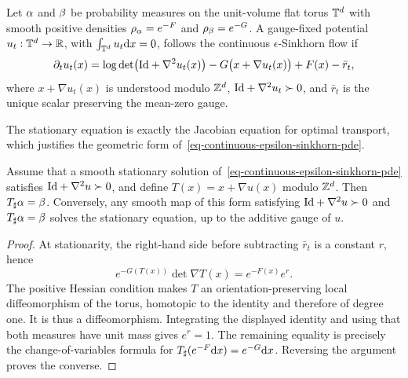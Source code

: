 \begin{defn}\label{def-continuous-epsilon-sinkhorn}
	Let $\alpha$ and $\beta$ be probability measures on the unit-volume flat torus $\mathbb{T}^d$ with smooth positive densities $\rho_{\alpha}=e^{-F}$ and $\rho_{\beta}=e^{-G}$. A gauge-fixed potential $u_t:\mathbb{T}^d\to\mathbb{R}$, with $\int_{\mathbb{T}^d}u_t\mathrm{d} x=0$, follows the continuous $\epsilon$-Sinkhorn flow if
	\begin{equation}\label{eq-continuous-epsilon-sinkhorn-pde}
		\partial_t u_t(x)
		=
		\log\det\bigl(\mathrm{Id}+\nabla^2u_t(x)\bigr)
		-G\bigl(x+\nabla u_t(x)\bigr)
		+F(x)-\bar r_t,
	\end{equation}
	where $x+\nabla u_t(x)$ is understood modulo $\mathbb{Z}^d$, $\mathrm{Id}+\nabla^2u_t\succ0$, and $\bar r_t$ is the unique scalar preserving the mean-zero gauge.
\end{defn}

The stationary equation is exactly the Jacobian equation for optimal transport, which justifies the geometric form of~\eqref{eq-continuous-epsilon-sinkhorn-pde}.

\begin{prop}\label{prop-continuous-sinkhorn-stationary}
	Assume that a smooth stationary solution of~\eqref{eq-continuous-epsilon-sinkhorn-pde} satisfies $\mathrm{Id}+\nabla^2u\succ0$, and define $T(x)=x+\nabla u(x)$ modulo $\mathbb{Z}^d$. Then $T_\sharp\alpha=\beta$. Conversely, any smooth map of this form satisfying $\mathrm{Id}+\nabla^2u\succ0$ and $T_\sharp\alpha=\beta$ solves the stationary equation, up to the additive gauge of $u$.
\end{prop}

\begin{proof}
	At stationarity, the right-hand side before subtracting $\bar r_t$ is a constant $r$, hence
	\[
		e^{-G(T(x))}\det\nabla T(x)=e^{-F(x)}e^r.
	\]
	The positive Hessian condition makes $T$ an orientation-preserving local diffeomorphism of the torus, homotopic to the identity and therefore of degree one. It is thus a diffeomorphism. Integrating the displayed identity and using that both measures have unit mass gives $e^r=1$. The remaining equality is precisely the change-of-variables formula for $T_\sharp(e^{-F}\mathrm{d} x)=e^{-G}\mathrm{d} x$. Reversing the argument proves the converse.
\end{proof}

